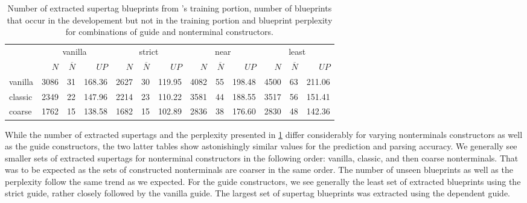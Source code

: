\documentclass[../../document.tex]{subfiles}
\begin{document}
    \begin{table}
        \caption{\label{tbl:gridsearch:1:1}
            Number of extracted supertag blueprints from \negra{}'s training portion, number of blueprints that occur in the developement but not in the training portion and blueprint perplexity for combinations of guide and nonterminal constructors.
        }
        \centering
        \setlength{\tabcolsep}{5pt}
        \vspace{.2cm}
        \begin{tabular}{l|rrr|rrr|rrr|rrr}
            \toprule
                        & \multicolumn{3}{c|}{vanilla} & \multicolumn{3}{c|}{strict} & \multicolumn{3}{c|}{near} & \multicolumn{3}{c}{least} \\
                        & $N$ & $\overline{N}$ & $\mathit{UP}$ & $N$ & $\overline{N}$ & $\mathit{UP}$ & $N$ & $\overline{N}$ & $\mathit{UP}$ & $N$ & $\overline{N}$ & $\mathit{UP}$ \\ \hline
            vanilla     & 3086 & 31 & 168.36 & 2627 & 30 & 119.95 & 4082 & 55 & 198.48 & 4500 & 63 & 211.06 \\
            classic     & 2349 & 22 & 147.96 & 2214 & 23 & 110.22 & 3581 & 44 & 188.55 & 3517 & 56 & 151.41 \\
            coarse      & 1762 & 15 & 138.58 & 1682 & 15 & 102.89 & 2836 & 38 & 176.60 & 2830 & 48 & 142.36 \\
            \bottomrule
        \end{tabular}
    \end{table}
    
    While the number of extracted supertags and the perplexity presented in \cref{tbl:gridsearch:1:1} differ considerably for varying nonterminals constructors as well as the guide constructors, the two latter tables show astonishingly similar values for the prediction and parsing accuracy.
    We generally see smaller sets of extracted supertags for nonterminal constructors in the following order: vanilla, classic, and then coarse nonterminals.
    That was to be expected as the sets of constructed nonterminals are coarser in the same order.
    The number of unseen blueprints as well as the perplexity follow the same trend as we expected.
    For the guide constructors, we see generally the least set of extracted blueprints using the strict guide, rather closely followed by the vanilla guide.
    The largest set of supertag blueprints was extracted using the dependent guide.
    
\end{document}
